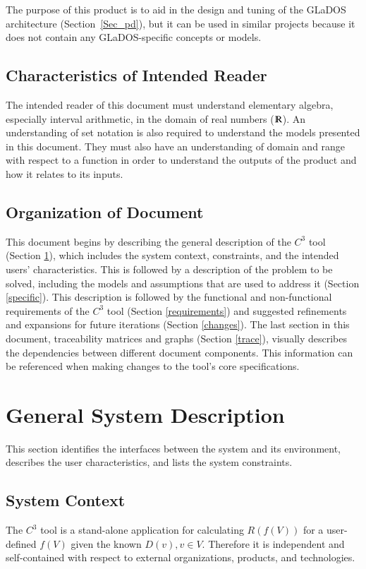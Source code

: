 \documentclass[12pt]{article}
\newcommand{\prognameAbbrv}{$C^{3}$}
\begin{document}
The purpose of this product is to aid in the design and tuning of the GLaDOS 
architecture (Section~\ref{Sec_pd}), but it can be used in similar projects 
because it does not contain any GLaDOS-specific concepts or models.

\subsection{Characteristics of Intended Reader}
\label{intro_reader}
The intended reader of this document must understand elementary algebra, 
especially interval arithmetic, in the domain of real numbers 
($\varmathbb{R}$). An understanding of set notation is also required to 
understand the models presented in this document. They must also have an 
understanding of domain and range with respect to a function in order to 
understand the outputs of the product 
and how it relates to its inputs.

\subsection{Organization of Document}
This document begins by describing the general description of the 
\prognameAbbrv{} tool (Section \ref{general}), which includes the system 
context, constraints, and the intended users' characteristics. This is followed 
by a description of the problem to be solved, including the models and 
assumptions that are used to address it (Section \ref{specific}). This 
description is followed by the functional and non-functional requirements of 
the \prognameAbbrv{} tool (Section \ref{requirements}) and suggested 
refinements and expansions for future iterations (Section \ref{changes}). The 
last section in this document, traceability matrices and graphs (Section 
\ref{trace}), visually describes the dependencies between different document 
components. This information can be referenced when making changes to the 
tool's core specifications.

\section{General System Description}
\label{general}

This section identifies the interfaces between the system and its environment,
describes the user characteristics, and lists the system constraints.

\subsection{System Context}
The \prognameAbbrv{} tool is a stand-alone application for calculating 
$R(f(V))$ for a user-defined $f(V)$ given the known $D(v), v\in V$. Therefore 
it is independent and self-contained with respect to external organizations, 
products, and technologies.
\end{document}
